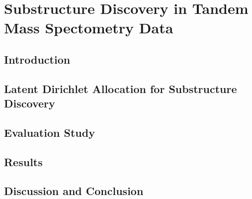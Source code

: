 \chapter{Substructure Discovery in Tandem Mass Spectometry Data}
\label{c:background}


\section{Introduction}

\section{Latent Dirichlet Allocation for Substructure Discovery}

\section{Evaluation Study}

\section{Results}

\section{Discussion and Conclusion}
